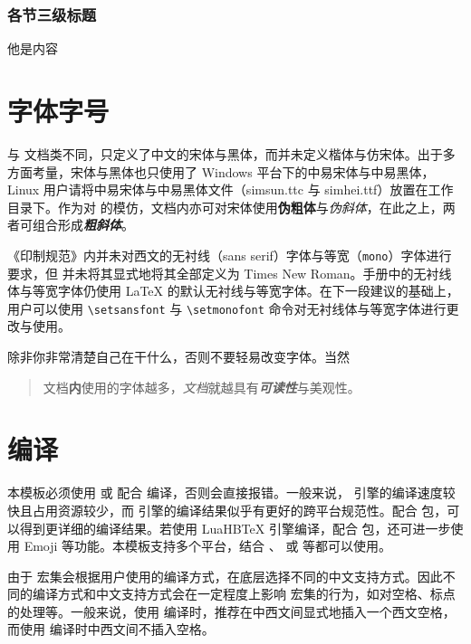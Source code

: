 \subsubsection{各节三级标题}
他是内容

\section{字体字号}
与 \CTeX 文档类不同，\WhuThesis 只定义了中文的宋体与{\heiti 黑体}，而并未定义楷体与仿宋体。出于多方面考量，宋体与黑体也只使用了 Windows 平台下的中易宋体与中易黑体，Linux 用户请将中易宋体与中易黑体文件（simsun.ttc 与 simhei.ttf）放置在工作目录下。作为对  的模仿，文档内亦可对宋体使用\textbf{伪粗体}与\textit{伪斜体}，在此之上，两者可组合形成\textbf{\textit{粗斜体}}。

\begin{notice}
    《印制规范》内并未对西文的无衬线（\textsf{sans serif}）字体与等宽（\texttt{mono}）字体进行要求，但 \WhuThesis 并未将其显式地将其全部定义为 Times New Roman。手册中的无衬线体与等宽字体仍使用 \LaTeX{} 的默认无衬线与等宽字体。在下一段建议的基础上，用户可以使用 \verb|\setsansfont| 与 \verb|\setmonofont| 命令对无衬线体与等宽字体进行更改与使用。

    除非你非常清楚自己在干什么，否则不要轻易改变字体。当然\\
    \begin{quote}
        文档\textbf{内}{\tiny 使用}的字体越{\huge \textsf{多}}，\textit{文档}就越具有\textbf{\textit{可读性}}{\large 与}{\Large 美}{\huge 观}{\Huge 性}。
    \end{quote}
\end{notice}

\section{编译}
本模板必须使用  或  配合  编译，否则会直接报错。一般来说， 引擎的编译速度较快且占用资源较少，而  引擎的编译结果似乎有更好的跨平台规范性。配合  包，可以得到更详细的编译结果。若使用 LuaHB\TeX{} 引擎编译，配合  包，还可进一步使用 Emoji 等功能。\emojitest 本模板支持多个平台，结合 、 或  等都可以使用。

\begin{notice}
    由于 \CTeX 宏集会根据用户使用的编译方式，在底层选择不同的中文支持方式。因此不同的编译方式和中文支持方式会在一定程度上影响 \CTeX 宏集的行为，如对空格、标点的处理等。一般来说，使用  编译时，推荐在中西文间显式地插入一个西文空格，而使用  编译时中西文间不插入空格。
\end{notice}

